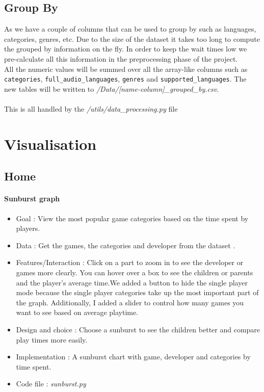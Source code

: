 \documentclass{article}
\begin{document}
	\subsection{Group By}
	
	As we have a couple of columns that can be used to group by such as languages, categories, genres, etc. Due to the size of the dataset it takes too long to compute the grouped by information on the fly. In order to keep the wait times low we pre-calculate all this information in the preprocessing phase of the project.\\
	All the numeric values will be summed over all the array-like columns such as \texttt{categories}, \texttt{full\_audio\_languages}, \texttt{genres} and \texttt{supported\_languages}. The new tables will be written to \textit{/Data/[name-column]\_grouped\_by.csv}.\\
	\\
	This is all handled by the \textit{/utils/data\_processing.py} file
	\newpage
	
	\section{Visualisation}
	\subsection{Home}

    \paragraph{Sunburst graph}
    \begin{itemize}
        \item Goal : View the most popular game categories based on the time spent by players.
        \item Data : Get the games, the categories and developer from the dataset .
        \item Features/Interaction : Click on a part to zoom in to see the developer or games more clearly. You can hover over a box to see the children or parents and the player's average time.We added a button to hide the single player mode because the single player categories take up the most important part of the graph. Additionally, I added a slider to control how many games you want to see based on average playtime.
        \item Design and choice : Choose a sunburst to see the children better and compare play times more easily.
        \item Implementation : A sunburst chart with game, developer and categories by time spent.
        \item Code file : \textit{sunburst.py}
    \end{itemize}
    
\end{document}
